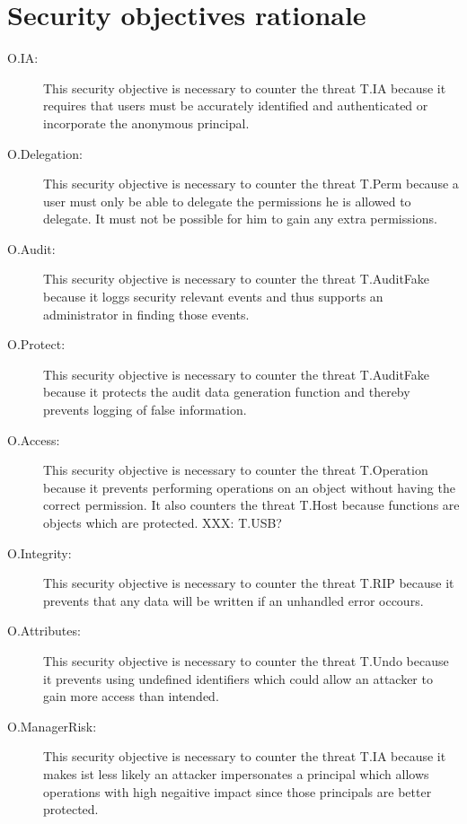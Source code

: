 \documentclass[12pt,english]{scrbook}
\begin{document}




\section{Security objectives rationale}

\begin{description}
  
  \item[O.IA:] This security objective is necessary to counter the threat T.IA
  because it requires that users must be accurately identified and
  authenticated or incorporate the anonymous principal.


  \item[O.Delegation:] This security objective is necessary to counter the
  threat T.Perm because a user must only be able to delegate the permissions
  he is allowed to delegate. It must not be possible for him to gain any extra
  permissions.
  
  \item[O.Audit:] This security objective is necessary to counter the threat
  T.AuditFake because it loggs security relevant events and thus supports an
  administrator in finding those events.

  \item[O.Protect:] This security objective is necessary to counter the threat
  T.AuditFake because it protects the audit data generation function and
  thereby prevents logging of false information.
  
  \item[O.Access:] This security objective is necessary to counter the threat
  T.Operation because it prevents performing operations on an object without
  having the correct permission. It also counters the threat T.Host because
  functions are objects which are protected.  XXX: T.USB?

  \item[O.Integrity:] This security objective is necessary to counter the
  threat T.RIP because it prevents that any data will be written if an 
  unhandled error occours.
  
  \item[O.Attributes:] This security objective is necessary to counter the
  threat T.Undo because it prevents using undefined identifiers which could
  allow an attacker to gain more access than intended.

  \item[O.ManagerRisk:] This security objective is necessary to counter the
  threat T.IA because it makes ist less likely an attacker impersonates a
  principal which allows operations with high negaitive impact since those
  principals are better protected.
    
  
\end{description}
\end{document}
